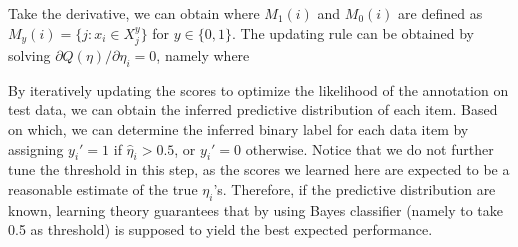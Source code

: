 Take the derivative, we can obtain
%
where $M_1(i)$ and $M_0(i)$ are defined as $M_y(i) = \{j:x_i \in X_j^y\}$ for $y \in \{0, 1\}$.  
The updating rule can be obtained by solving $\partial Q(\eta) / \partial \eta_i = 0$, namely
where

By iteratively updating the scores to optimize the likelihood of the annotation on test data, 
we can obtain the inferred predictive distribution of each item.  
Based on which, we can determine the inferred binary label for each data item by assigning $y_i'=1$ if $\hat{\eta}_i > 0.5$, 
or $y_i'=0$ otherwise.  
Notice that we do not further tune the threshold in this step, 
as the scores we learned here are expected to be a reasonable estimate of the true $\eta_i$'s. 
Therefore, if the predictive distribution are known, 
learning theory guarantees that by using Bayes classifier (namely to take 0.5 as threshold) 
is supposed to yield the best expected performance.  




